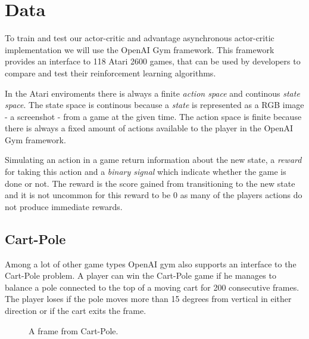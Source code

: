 \documentclass[11pt]{article}
\begin{document}
\maketitle

\section{Data}\label{Data}

To train and test our actor-critic and advantage asynchronous actor-critic implementation we will use
the OpenAI Gym framework\cite{openAIGym}.
This framework provides an interface to 118 Atari 2600 games,
that can be used by developers to compare and test their reinforcement learning algorithms.

 
In the Atari enviroments there is always a finite \textit{action space} and continous \textit{state space}.
The state space is continous because a \textit{state} is represented as a RGB image - a screenshot - from a game
at the given time. The action space is finite because there is always a fixed amount of
actions available to the player in the OpenAI Gym framework.

Simulating an action in a game return information about the new state,
a \textit{reward} for taking this action and a \textit{binary signal} which indicate whether the 
game is done or not.
The reward is the score gained from transitioning to the new state and
it is not uncommon for this reward to be $0$ as many of the players actions do not produce immediate rewards.

\subsection{Cart-Pole}

Among a lot of other game types OpenAI gym also supports an interface
to the Cart-Pole problem.
A player can win the Cart-Pole game if he manages to balance a pole connected to the top of a moving cart for
200 consecutive frames.
The player loses if the pole moves more than 15 degrees from vertical in
either direction or if the cart exits the frame.

\begin{figure}[!h]
    \centering
    \caption{A frame from Cart-Pole.}
    \label{fig:cartpole}
\end{figure}
\end{document}
